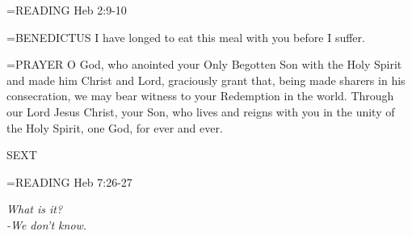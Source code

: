 \hangindent=\parindent \small{READING}    Heb 2:9-10 \textbf{   \\}

\hangindent=\parindent \small{BENEDICTUS 	I have longed to eat this meal with you before I suffer.\\}

\hangindent=\parindent \small{PRAYER 	O God, who anointed your Only Begotten Son with the Holy Spirit and made him Christ and Lord, graciously grant that, being made sharers in his consecration, we may bear witness to your Redemption in the world. Through our Lord Jesus Christ, your Son, who lives and reigns with you in the unity of the Holy Spirit, one God, for ever and ever.}

\begin{flushleft}\normalsize SEXT\\\end{flushleft}

\hangindent=\parindent \small{READING}    Heb 7:26-27 \textbf{   }

\begin{center}
\textit{What is it?\\
-We don't know.}
\end{center}

